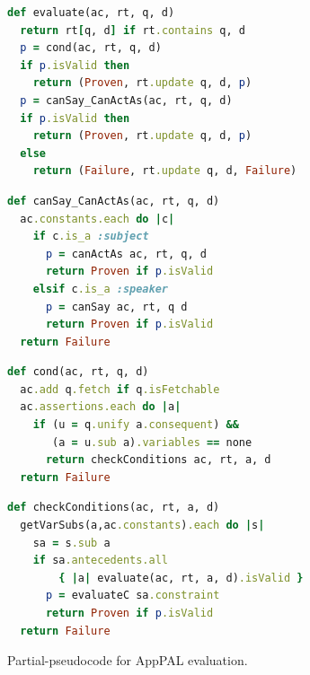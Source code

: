 \documentclass[]{llncs}
\begin{document}
\begin{figure}\centering
\begin{minipage}[b]{0.49\linewidth}
\begin{lstlisting}[language=Ruby, basicstyle=\ttfamily\scriptsize, keywordstyle=\scriptsize\slshape, columns=flexible]
def evaluate(ac, rt, q, d)
  return rt[q, d] if rt.contains q, d
  p = cond(ac, rt, q, d)
  if p.isValid then
    return (Proven, rt.update q, d, p)
  p = canSay_CanActAs(ac, rt, q, d)
  if p.isValid then
    return (Proven, rt.update q, d, p)
  else
    return (Failure, rt.update q, d, Failure)
\end{lstlisting}
\end{minipage}
\begin{minipage}[b]{0.49\linewidth}
\begin{lstlisting}[language=Ruby, basicstyle=\ttfamily\scriptsize, keywordstyle=\scriptsize\slshape, columns=flexible]
def canSay_CanActAs(ac, rt, q, d)
  ac.constants.each do |c|
    if c.is_a :subject
      p = canActAs ac, rt, q, d
      return Proven if p.isValid
    elsif c.is_a :speaker
      p = canSay ac, rt, q d
      return Proven if p.isValid
  return Failure
\end{lstlisting}
\end{minipage}

\begin{minipage}[b]{0.49\linewidth}
\begin{lstlisting}[language=Ruby, basicstyle=\ttfamily\scriptsize, keywordstyle=\scriptsize\slshape, columns=flexible]
def cond(ac, rt, q, d)
  ac.add q.fetch if q.isFetchable
  ac.assertions.each do |a|
    if (u = q.unify a.consequent) &&
       (a = u.sub a).variables == none
      return checkConditions ac, rt, a, d
  return Failure
\end{lstlisting}
\end{minipage}
\begin{minipage}[b]{0.49\linewidth}
\begin{lstlisting}[language=Ruby, basicstyle=\ttfamily\scriptsize, keywordstyle=\scriptsize\slshape, columns=flexible]
def checkConditions(ac, rt, a, d)
  getVarSubs(a,ac.constants).each do |s|
    sa = s.sub a
    if sa.antecedents.all
        { |a| evaluate(ac, rt, a, d).isValid }
      p = evaluateC sa.constraint
      return Proven if p.isValid
  return Failure
\end{lstlisting}
\end{minipage}
\caption{Partial-pseudocode for AppPAL evaluation.}
\label{fig:pseudocode}
\end{figure}
\end{document}
